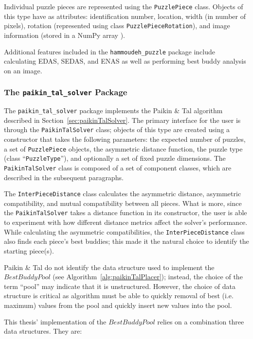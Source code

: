 \documentclass{report}
\newcommand{\hammoudehPuzzlePackage}{\texttt{hammoudeh\_puzzle} }
\newcommand{\paikinTalPackage}{\texttt{paikin\_tal\_solver} }
\begin{document}
Individual puzzle pieces are represented using the \texttt{PuzzlePiece} class.  Objects of this type have as attributes: identification number, location, width (in number of pixels), rotation (represented using class \texttt{PuzzlePieceRotation}), and image information (stored in a NumPy array \cite{walt2011}).

Additional features included in the \hammoudehPuzzlePackage package include calculating EDAS, SEDAS, and ENAS as well as performing best buddy analysis on an image.

\subsubsection{The \paikinTalPackage Package}\label{sec:paikinTalSolverPackage}

The \paikinTalPackage package implements the Paikin \& Tal algorithm described in Section~\ref{sec:paikinTalSolver}.  The primary interface for the user is through the \texttt{PaikinTalSolver} class; objects of this type are created using a constructor that takes the following parameters: the expected number of puzzles, a set of \texttt{PuzzlePiece} objects, the asymmetric distance function, the puzzle type (class ``\texttt{PuzzleType}''), and optionally a set of fixed puzzle dimensions.  The \texttt{PaikinTalSolver} class is composed of a set of component classes, which are described in the subsequent paragraphs.

The \texttt{InterPieceDistance} class calculates the asymmetric distance, asymmetric compatibility, and mutual compatibility between all pieces.  What is more, since the \texttt{PaikinTalSolver} takes a distance function in its constructor, the user is able to experiment with how different distance metrics affect the solver's performance.  While calculating the asymmetric compatibilities, the \texttt{InterPieceDistance} class also finds each piece's best buddies; this made it the natural choice to identify the starting piece(s).

Paikin \& Tal do not identify the data structure used to  implement the $BestBuddyPool$ (see Algorithm~\ref{alg:paikinTalPlacer}); instead, the choice of the term ``pool'' may indicate that it is unstructured. However, the choice of data structure is critical as algorithm must be able to quickly removal of best (i.e. maximum) values from the pool and quickly insert new values into the pool.

This thesis' implementation of the $BestBuddyPool$ relies on a combination three data structures.  They are:
\end{document}
